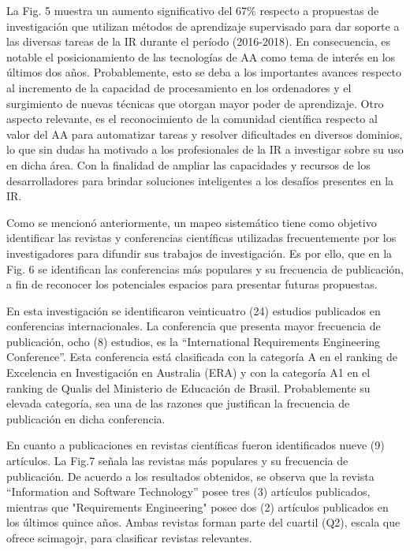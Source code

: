 \documentclass[journal]{IEEEtran}
\begin{document}
La Fig. 5 muestra un aumento significativo del 67\% respecto a propuestas de investigación que utilizan métodos de aprendizaje supervisado para dar soporte a las diversas tareas de la IR durante el período (2016-2018). En consecuencia, es notable el posicionamiento de las tecnologías de AA como tema de interés en los últimos dos años. Probablemente, esto se deba a los importantes avances respecto al incremento de la capacidad de procesamiento en los ordenadores y el surgimiento de nuevas técnicas que otorgan mayor poder de aprendizaje. Otro aspecto relevante, es el reconocimiento de la comunidad científica respecto al valor del AA para automatizar tareas y resolver dificultades en diversos dominios, lo que sin dudas ha motivado a los profesionales de la IR a investigar sobre su uso en dicha área. Con la finalidad de ampliar las capacidades y recursos de los desarrolladores para brindar soluciones inteligentes a los desafíos presentes en la IR. 

Como se mencionó anteriormente, un mapeo sistemático tiene como objetivo identificar las revistas y conferencias científicas utilizadas frecuentemente por los investigadores para difundir sus trabajos de investigación. Es por ello, que en la Fig. 6 se identifican las conferencias más populares y su frecuencia de publicación, a fin de reconocer los potenciales espacios para presentar futuras propuestas. 

En esta investigación se identificaron veinticuatro (24) estudios publicados en conferencias internacionales. La conferencia que presenta mayor frecuencia de publicación, ocho (8) estudios, es la “International Requirements Engineering Conference”. Esta conferencia está clasificada con la categoría A en el ranking de Excelencia en Investigación en Australia (ERA) y con la categoría A1 en el ranking de Qualis del Ministerio de Educación de Brasil. Probablemente su elevada categoría, sea una de las razones que justifican la frecuencia de publicación en dicha conferencia. 

En cuanto a publicaciones en revistas científicas fueron identificados nueve (9) artículos. La Fig.7 señala las revistas más populares y su frecuencia de publicación. De acuerdo a los resultados obtenidos, se observa que la revista “Information and Software Technology” posee tres (3) artículos publicados, mientras que "Requirements Engineering" posee dos (2) artículos publicados en los últimos quince años. Ambas revistas forman parte del cuartil (Q2), escala que ofrece scimagojr, para clasificar revistas relevantes. 
\end{document}
